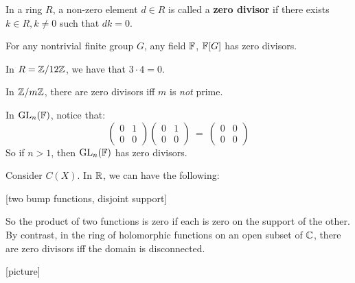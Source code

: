 \begin{defn}
    In a ring $ R $, a non-zero element $ d \in R $ is called a \textbf{zero divisor} if
    there exists $ k \in R, k \neq 0 $ such that $ dk = 0 $.
\end{defn}

\begin{crll}
    For any nontrivial finite group $ G $, any field $ \mathbb{F} $, $ \mathbb{F}[G] $ has zero divisors.
\end{crll}

\begin{xmp}[source=Primary Source Material]
    In $ R = \mathbb{Z}/12\mathbb{Z} $, we have that $ 3\cdot 4 = 0 $.
\end{xmp}

\begin{crll}
    In $ \mathbb{Z}/m\mathbb{Z} $, there are zero divisors iff $ m $ is \textit{not} prime.
\end{crll}

\begin{xmp}[source=Primary Source Material]
    In $ \operatorname{GL}_{n}(\mathbb{F}) $, notice that:
    \begin{equation*}
        \begin{pmatrix}
            0 & 1 \\ 0 & 0
        \end{pmatrix}
        \begin{pmatrix}
            0 & 1 \\ 0 & 0
        \end{pmatrix} \ = \
        \begin{pmatrix}
            0 & 0 \\ 0 & 0
        \end{pmatrix}
    \end{equation*}
    So if $ n > 1 $, then $ \operatorname{GL}_{n}(\mathbb{F}) $ has zero divisors.
\end{xmp}

\begin{xmp}[source=Primary Source Material]
    Consider $ C(X) $. In $ \mathbb{R} $, we can have the following:

    [two bump functions, disjoint support]

    So the product of two functions is zero if each is zero on the support of the other. \vsp
    By contrast, in the ring of holomorphic functions on an open subset of $ \mathbb{C} $,
    there are zero divisors iff the domain is disconnected.

    [picture]
\end{xmp}

